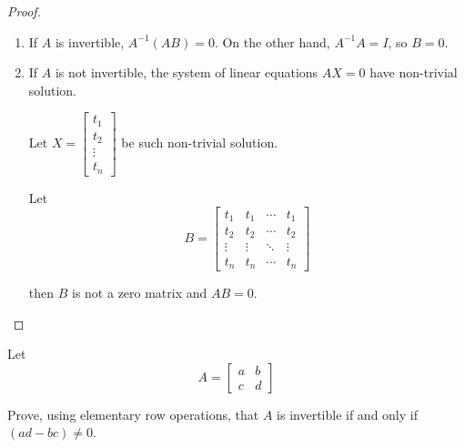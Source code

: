 \begin{proof}
    \begin{enumerate}[label={(\alph*)}]
        \item If $A$ is invertible, $A^{-1}(AB) = 0$. On the other hand, $A^{-1}A = I$, so $B = 0$.
        \item If $A$ is not invertible, the system of linear equations $AX = 0$ have non-trivial solution.

              Let $X = \begin{bmatrix} t_{1} \\ t_{2} \\ \vdots \\ t_{n} \end{bmatrix}$ be such non-trivial solution.

              Let
              \[
                  B = \begin{bmatrix}
                      t_{1}  & t_{1}  & \cdots & t_{1}  \\
                      t_{2}  & t_{2}  & \cdots & t_{2}  \\
                      \vdots & \vdots & \ddots & \vdots \\
                      t_{n}  & t_{n}  & \cdots & t_{n}
                  \end{bmatrix}
              \]

              then $B$ is not a zero matrix and $AB = 0$.
    \end{enumerate}
\end{proof}

\begin{exercise}
    Let
    \[
        A = \begin{bmatrix}
            a & b \\
            c & d
        \end{bmatrix}
    \]

    Prove, using elementary row operations, that $A$ is invertible if and only if $(ad - bc)\ne 0$.
\end{exercise}

